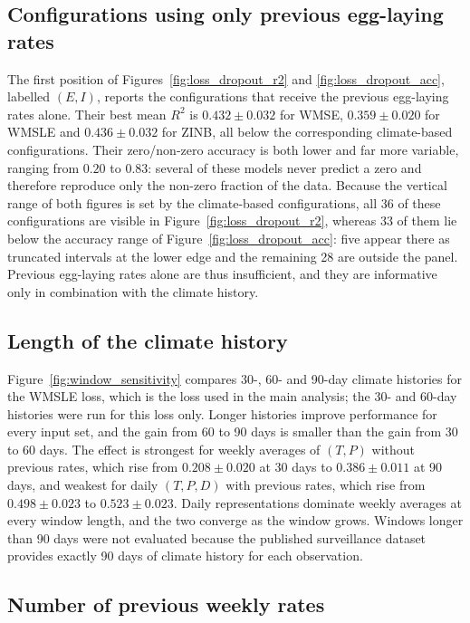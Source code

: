 \documentclass[11pt,a4paper]{article}
\begin{document}
\subsection{Configurations using only previous egg-laying rates}
\label{sec:history_only}

The first position of Figures~\ref{fig:loss_dropout_r2} and \ref{fig:loss_dropout_acc}, labelled $(E,I)$, reports the configurations that receive the previous egg-laying rates alone. Their best mean $R^2$ is $0.432 \pm 0.032$ for WMSE, $0.359 \pm 0.020$ for WMSLE and $0.436 \pm 0.032$ for ZINB, all below the corresponding climate-based configurations. Their zero/non-zero accuracy is both lower and far more variable, ranging from $0.20$ to $0.83$: several of these models never predict a zero and therefore reproduce only the non-zero fraction of the data. Because the vertical range of both figures is set by the climate-based configurations, all 36 of these configurations are visible in Figure~\ref{fig:loss_dropout_r2}, whereas 33 of them lie below the accuracy range of Figure~\ref{fig:loss_dropout_acc}: five appear there as truncated intervals at the lower edge and the remaining 28 are outside the panel. Previous egg-laying rates alone are thus insufficient, and they are informative only in combination with the climate history.

\subsection{Length of the climate history}

Figure~\ref{fig:window_sensitivity} compares 30-, 60- and 90-day climate histories for the WMSLE loss, which is the loss used in the main analysis; the 30- and 60-day histories were run for this loss only. Longer histories improve performance for every input set, and the gain from 60 to 90 days is smaller than the gain from 30 to 60 days. The effect is strongest for weekly averages of $(T,P)$ without previous rates, which rise from $0.208 \pm 0.020$ at 30 days to $0.386 \pm 0.011$ at 90 days, and weakest for daily $(T,P,D)$ with previous rates, which rise from $0.498 \pm 0.023$ to $0.523 \pm 0.023$. Daily representations dominate weekly averages at every window length, and the two converge as the window grows. Windows longer than 90 days were not evaluated because the published surveillance dataset provides exactly 90 days of climate history for each observation.

\subsection{Number of previous weekly rates}
\end{document}
